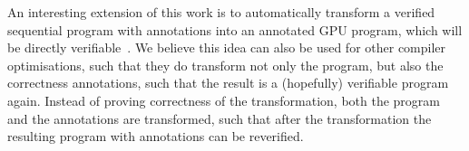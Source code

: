 An interesting extension of this work is to automatically transform a verified sequential program with annotations into an annotated GPU program, which will be directly verifiable~\cite{HuismanBDS18}.
We believe this idea can also be used for other compiler optimisations, such that
they do transform  not only the program, but also the correctness annotations, such that the result is a (hopefully) verifiable program again. Instead of proving correctness of the transformation, both the program and the annotations are transformed, such that after the transformation the resulting program with annotations can be reverified.







